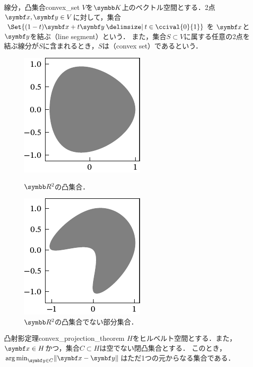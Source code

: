 \documentclass[../../main]{subfiles}
\begin{document}
\begin{definition}{線分，凸集合}{convex_set}
  \(V\)を\(\numset{K}\)上のベクトル空間とする．2点\(\vect{x},\vect{y}\in V\)に対して，集合\(\Set{(1-t)\vect{x}+t\vect{y}\given t\in\ccival{0}{1}}\)を
  \(\vect{x}\)と\(\vect{y}\)を結ぶ（line segment）という．
  また，集合\(S\subset V\)に属する任意の2点を結ぶ線分が\(S\)に含まれるとき，\(S\)は（convex set）であるという．
\end{definition}

\begin{figure}[htbp]
  \begin{minipage}{0.5\linewidth}
    \centering
    \includegraphics{figures/convex.pdf}
    \caption{\(\numset{R}^2\)の凸集合．}
  \end{minipage}%
  \begin{minipage}{0.5\linewidth}
    \centering
    \includegraphics{figures/non_convex.pdf}
    \caption{\(\numset{R}^2\)の凸集合でない部分集合．}
  \end{minipage}
\end{figure}

\begin{theorem}{凸射影定理}{convex_projection_theorem}
  \(H\)をヒルベルト空間とする．また，\(\vect{x}\in H\)かつ，集合\(C\subset H\)は空でない閉凸集合とする．
  このとき，\(\argmin_{\vect{y}\in C}\vnorm{\vect{x}-\vect{y}}\)はただ1つの元からなる集合である．
\end{theorem}
\end{document}
